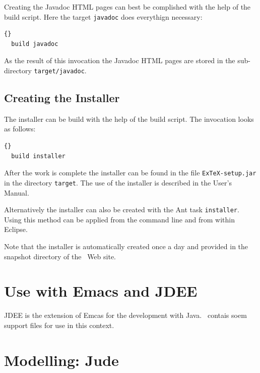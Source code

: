 \documentclass{extex-doc}
\newcommand\File[1]{\texttt{#1}}
\begin{document}
Creating the Javadoc HTML pages can best be complished with the help
of the build script. Here the target \texttt{javadoc} does everythign
necessary:

\begin{lstlisting}{}
  build javadoc
\end{lstlisting}{}

As the result of this invocation the Javadoc HTML pages are stored in
the sub-directory \File{target/javadoc}.


\subsection{Creating the Installer}

The installer can be build with the help of the build script. The
invocation looks as follows:

\begin{lstlisting}{}
  build installer
\end{lstlisting}{}

After the work is complete the installer can be found in the file
\File{ExTeX-setup.jar} in the directory \File{target}. The use of the
installer is described in the User's Manual.

Alternatively the installer can also be created with the Ant task
\texttt{installer}. Using this method can be applied from the command
line and from within Eclipse.

Note that the installer is automatically created once a day and
provided in the snapshot directory of the \ExTeX\ Web site.


\section{Use with Emacs and JDEE}

JDEE is the extension of Emcas for the development with Java. \ExTeX\
contais soem support files for use in this context.

\INCOMPLETE



\section{Modelling: Jude}
\end{document}
